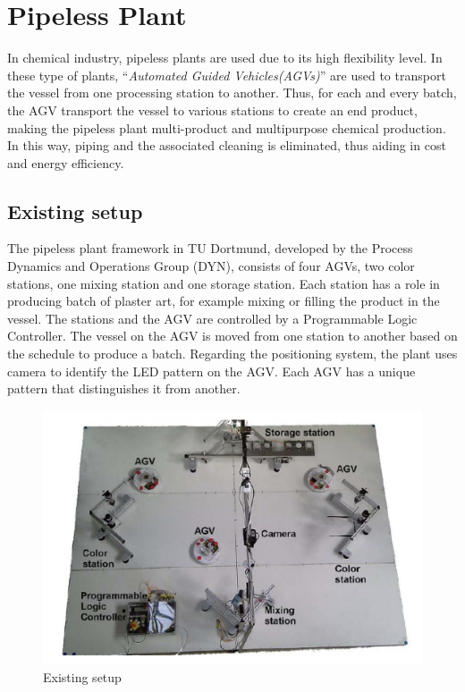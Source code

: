 \section{Pipeless Plant} %

In chemical industry, pipeless plants are used due to its high flexibility level. In these type of plants, ``\textit{Automated Guided Vehicles(AGVs)}'' are used to transport the vessel from one processing station to another. Thus, for each and every batch, the AGV transport the vessel to various stations to create an end product, making the pipeless plant multi-product and multipurpose chemical production. In this way, piping and the associated cleaning is eliminated, thus aiding in cost and energy efficiency.

\subsection{Existing setup}
 
 The pipeless plant framework in TU Dortmund, developed by the Process Dynamics and Operations Group (DYN), consists of four AGVs, two color stations, one mixing station and one storage station. Each station has a role in producing batch of plaster art, for example mixing or filling the product in the vessel. The stations and the AGV are controlled by a Programmable Logic Controller. The vessel on the AGV is moved from one station to another based on the schedule to produce a batch. Regarding the positioning system, the plant uses camera to identify the LED pattern on the AGV. Each AGV has a unique pattern that distinguishes it from another.


\begin{figure}[!htbp]
	\centering
	\includegraphics[width=14cm]{Pictures/Plant.png}
	\caption{Existing setup}
	\label{Pipeless plant}
\end{figure}


